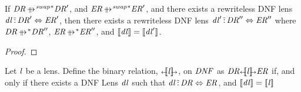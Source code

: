 \documentclass[numbers]{sigplanconf}
\begin{document}
\begin{lemma}
  \label{lem:parallel-rewrite-equivalence-in-dnf-lenses}
  If $\DNFRegex \StarOf{\ParallelRewriteSwap} \DNFRegex'$, and $\DNFRegexAlt
  \StarOf{\ParallelRewriteSwap} \DNFRegexAlt'$, and there exists a rewriteless DNF lens
  $\mathit{dl} \,\tilde{:}\, \mathit{DR}' \Leftrightarrow \mathit{ER}'$, then there exists
  a rewriteless DNF lens
  $\mathit{dl}' \,\tilde{:}\, \mathit{DR}'' \Leftrightarrow \mathit{ER}''$ where
  $\DNFRegex \StarOf{\ParallelRewrite} \DNFRegex''$, $\DNFRegexAlt
  \StarOf{\ParallelRewrite} \DNFRegexAlt''$, and
  $[ \! [\mathit{dl}] \! ] = [ \! [\mathit{dl}'] \! ]$.
\end{lemma}
\begin{proof}
\end{proof}

\begin{definition}
  Let $\mathit{l}$ be a lens.  Define the binary relation, $\DNFLensHasSemanticsOf{\Lens}$,
  on $\mathit{DNF}$ as
  $\SatisfiesDNFLensHasSemanticsOf{\Lens}{\DNFRegex}{\DNFRegexAlt}$ if, and
  only if there exists a DNF Lens $\mathit{dl}$ such that $\mathit{dl}
  \,\tilde{:}\, \mathit{DR} \Leftrightarrow \mathit{ER}$, and
  $[ \! [\mathit{dl}] \! ]=[ \! [\mathit{l}] \! ]$
\end{definition}
\end{document}

